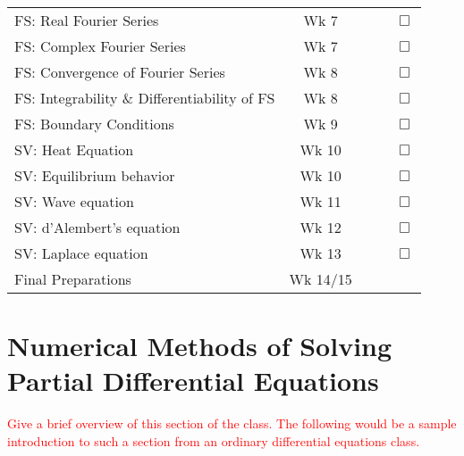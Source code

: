 \documentclass{article}
\newcommand{\unchecked}{$\Box$}
\newcommand{\red}[1]{\textcolor{red}{#1}}
\begin{document}
\begin{tabular}{|l|c|c|c|c}
\multirow{2}{5cm}{FS: Real Fourier Series} & \multirow{2}{1.5cm}{Wk 7} &&& \multirow{2}{.4cm}{\unchecked} \\ &&&& \\ \cline{1-4}
\multirow{2}{5cm}{FS: Complex Fourier Series} & \multirow{2}{1.5cm}{Wk 7} &&& \multirow{2}{.4cm}{\unchecked} \\ &&&& \\ \cline{1-4}
\multirow{2}{7cm}{FS: Convergence of Fourier Series} & \multirow{2}{1.5cm}{Wk 8} &&& \multirow{2}{.4cm}{\unchecked} \\ &&&& \\  \cline{1-4}
\multirow{2}{7cm}{FS: Integrability \& Differentiability of FS} & \multirow{2}{1.5cm}{Wk 8} &&& \multirow{2}{.4cm}{\unchecked} \\ &&&& \\  \cline{1-4}
\multirow{2}{5cm}{FS: Boundary Conditions} & \multirow{2}{1.5cm}{Wk 9} &&& \multirow{2}{.4cm}{\unchecked} \\ &&&& \\ \cline{1-4}
\multirow{2}{5cm}{SV: Heat Equation} & \multirow{2}{1.5cm}{Wk 10} &&& \multirow{2}{.4cm}{\unchecked} \\ &&&& \\ \cline{1-4}
\multirow{2}{5cm}{SV: Equilibrium behavior} & \multirow{2}{1.5cm}{Wk 10} &&& \multirow{2}{.4cm}{\unchecked} \\ &&&& \\ \cline{1-4}
\multirow{2}{5cm}{SV: Wave equation} & \multirow{2}{1.5cm}{Wk 11} &&& \multirow{2}{.4cm}{\unchecked} \\ &&&& \\ \cline{1-4}
\multirow{2}{5cm}{SV: d'Alembert's equation} & \multirow{2}{1.5cm}{Wk 12} &&& \multirow{2}{.4cm}{\unchecked} \\ &&&& \\ \cline{1-4}
\multirow{2}{5cm}{SV: Laplace equation} & \multirow{2}{1.5cm}{Wk 13} &&& \multirow{2}{.4cm}{\unchecked} \\ &&&& \\ \cline{1-4}
\multirow{2}{5cm}{Final Preparations} & \multirow{2}{1.8cm}{Wk 14/15} &&&   \\&&&& \\ \cline{1-4}
\end{tabular}
\newpage
\section{Numerical Methods of Solving Partial Differential Equations}
\red{Give a brief overview of this section of the class. The following would be a sample introduction to such a section from an ordinary differential equations class.}
\end{document}
